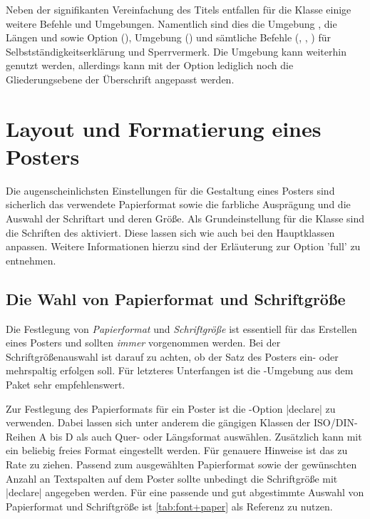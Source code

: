 \begin{Bundle*}[v2.05]{}
Neben der signifikanten Vereinfachung des Titels entfallen für die Klasse 
 einige weitere Befehle und Umgebungen. Namentlich sind 
dies die Umgebung , die Längen  
und  sowie Option (), Umgebung 
() und sämtliche Befehle (, 
, ) für Selbstständigkeitserklärung und 
Sperrvermerk. Die Umgebung  kann weiterhin genutzt 
werden, allerdings kann mit der Option  lediglich noch die 
Gliederungsebene der Überschrift angepasst werden.



\section{Layout und Formatierung eines Posters}
%
Die augenscheinlichsten Einstellungen für die Gestaltung eines Posters sind 
sicherlich das verwendete Papierformat sowie die farbliche Ausprägung und die 
Auswahl der Schriftart und deren Größe. Als Grundeinstellung für die Klasse
 sind die Schriften des \TUDCDs aktiviert. Diese lassen 
sich wie auch bei den Hauptklassen anpassen. Weitere Informationen hierzu sind 
der Erläuterung zur Option 'full' zu entnehmen. 


\subsection{Die Wahl von Papierformat und Schriftgröße}
%
%

Die Festlegung von \emph{Papierformat} und \emph{Schriftgröße} ist essentiell 
für das Erstellen eines Posters und sollten \emph{immer} vorgenommen werden. 
Bei der Schriftgrößenauswahl ist darauf zu achten, ob der Satz des Posters 
ein- oder mehrspaltig erfolgen soll. Für letzteres Unterfangen ist die 
-Umgebung aus dem Paket  sehr 
empfehlenswert. 

Zur Festlegung des Papierformats für ein Poster ist die \KOMAScript-Option 
|declare| zu verwenden. Dabei lassen sich unter 
anderem die gängigen Klassen der ISO/DIN-Reihen A bis D als auch Quer- oder 
Längsformat auswählen. Zusätzlich kann mit  ein beliebig 
freies Format eingestellt werden. Für genauere Hinweise ist das \scrguide zu 
Rate zu ziehen. Passend zum ausgewählten Papierformat sowie der gewünschten 
Anzahl an Textspalten auf dem Poster sollte unbedingt die Schriftgröße mit 
|declare| angegeben werden. Für eine 
passende und gut abgestimmte Auswahl von Papierformat und Schriftgröße ist 
\autoref{tab:font+paper} als Referenz zu nutzen.


\end{Bundle*}
